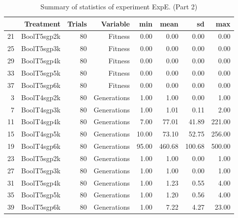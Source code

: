 \begin{table}[ht]
\centering
\begin{tabular}{rrrrrrrr}
  \hline
 & Treatment & Trials & Variable & min & mean & sd & max \\ 
  \hline
21 & BoolT5sgp2k &  80 & Fitness & 0.00 & 0.00 & 0.00 & 0.00 \\ 
  25 & BoolT5sgp3k &  80 & Fitness & 0.00 & 0.00 & 0.00 & 0.00 \\ 
  29 & BoolT5sgp4k &  80 & Fitness & 0.00 & 0.00 & 0.00 & 0.00 \\ 
  33 & BoolT5sgp5k &  80 & Fitness & 0.00 & 0.00 & 0.00 & 0.00 \\ 
  37 & BoolT5sgp6k &  80 & Fitness & 0.00 & 0.00 & 0.00 & 0.00 \\ 
  3 & BoolT4sgp2k &  80 & Generations & 1.00 & 1.00 & 0.00 & 1.00 \\ 
  7 & BoolT4sgp3k &  80 & Generations & 1.00 & 1.01 & 0.11 & 2.00 \\ 
  11 & BoolT4sgp4k &  80 & Generations & 7.00 & 77.01 & 41.89 & 221.00 \\ 
  15 & BoolT4sgp5k &  80 & Generations & 10.00 & 73.10 & 52.75 & 256.00 \\ 
  19 & BoolT4sgp6k &  80 & Generations & 95.00 & 460.68 & 100.68 & 500.00 \\ 
  23 & BoolT5sgp2k &  80 & Generations & 1.00 & 1.00 & 0.00 & 1.00 \\ 
  27 & BoolT5sgp3k &  80 & Generations & 1.00 & 1.00 & 0.00 & 1.00 \\ 
  31 & BoolT5sgp4k &  80 & Generations & 1.00 & 1.23 & 0.55 & 4.00 \\ 
  35 & BoolT5sgp5k &  80 & Generations & 1.00 & 1.20 & 0.56 & 4.00 \\ 
  39 & BoolT5sgp6k &  80 & Generations & 1.00 & 7.22 & 4.27 & 23.00 \\ 
   \hline
\end{tabular}
\caption{Summary of statistics of experiment ExpE. (Part 2)} 
\end{table}
